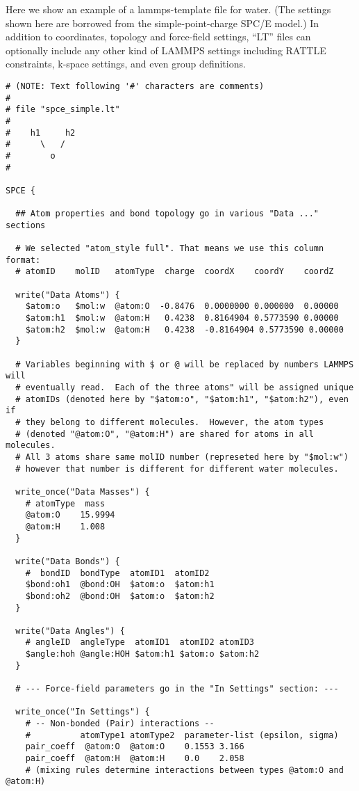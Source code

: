 \documentclass[11pt]{article}
\begin{document}
  Here we show an example of a lammps-template file for water.
(The settings shown here are borrowed from the simple-point-charge 
 \cite{Berendsen++StraatsmaJPhysChem1987} SPC/E model.) 
In addition to coordinates, topology and force-field settings, 
``LT'' files can optionally include any other kind of LAMMPS settings
including RATTLE constraints, k-space settings, and even group definitions.
\begin{verbatim}
# (NOTE: Text following '#' characters are comments)
#
# file "spce_simple.lt" 
#
#    h1     h2
#      \   /
#        o
#

SPCE {

  ## Atom properties and bond topology go in various "Data ..." sections

  # We selected "atom_style full". That means we use this column format:
  # atomID    molID   atomType  charge  coordX    coordY    coordZ

  write("Data Atoms") {
    $atom:o   $mol:w  @atom:O  -0.8476  0.0000000 0.000000  0.00000
    $atom:h1  $mol:w  @atom:H   0.4238  0.8164904 0.5773590 0.00000
    $atom:h2  $mol:w  @atom:H   0.4238  -0.8164904 0.5773590 0.00000
  }

  # Variables beginning with $ or @ will be replaced by numbers LAMMPS will
  # eventually read.  Each of the three atoms" will be assigned unique
  # atomIDs (denoted here by "$atom:o", "$atom:h1", "$atom:h2"), even if
  # they belong to different molecules.  However, the atom types
  # (denoted "@atom:O", "@atom:H") are shared for atoms in all molecules.
  # All 3 atoms share same molID number (represeted here by "$mol:w")
  # however that number is different for different water molecules.

  write_once("Data Masses") {
    # atomType  mass
    @atom:O    15.9994
    @atom:H    1.008
  }

  write("Data Bonds") {
    #  bondID  bondType  atomID1  atomID2
    $bond:oh1  @bond:OH  $atom:o  $atom:h1
    $bond:oh2  @bond:OH  $atom:o  $atom:h2
  }

  write("Data Angles") {
    # angleID  angleType  atomID1  atomID2 atomID3
    $angle:hoh @angle:HOH $atom:h1 $atom:o $atom:h2
  }

  # --- Force-field parameters go in the "In Settings" section: ---

  write_once("In Settings") {
    # -- Non-bonded (Pair) interactions --
    #          atomType1 atomType2  parameter-list (epsilon, sigma)
    pair_coeff  @atom:O  @atom:O    0.1553 3.166 
    pair_coeff  @atom:H  @atom:H    0.0    2.058
    # (mixing rules determine interactions between types @atom:O and @atom:H)


\end{verbatim}
\end{document}
